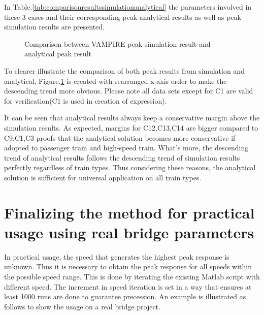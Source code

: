 In Table.\ref{tab:comparisonresultssimulationanalytical} the parameters involved in these 3 cases and their corresponding peak analytical results as well as peak simulation results are presented. 



\begin{figure}[h!]
\centering
{}
\caption{Comparison between VAMPIRE peak simulation result and analytical peak result}
\label{fig:comparisonpeaksimulationanalytical}
\end{figure}

To clearer illustrate the comparison of both peak results from simulation and analytical, Figure.\ref{fig:comparisonpeaksimulationanalytical} is created with rearranged x-axis order to make the descending trend more obvious. Please note all data sets except for C1 are valid for verification(C1 is used in creation of expression).

It can be seen that analytical results always keep a conservative margin above the simulation results. As expected, margins for C12,C13,C14 are bigger compared to C9,C1,C3 proofs that the analytical solution becomes more conservative if adopted to passenger train and high-speed train. What's more, the descending trend of analytical results follows the descending trend of simulation results perfectly regardless of train types. Thus considering these reasons, the analytical solution is sufficient for universal application on all train types.

\chapter{Finalizing the method for practical usage using real bridge parameters}

In practical usage, the speed that generates the highest peak response is unknown. Thus it is necessary to obtain the peak response for all speeds within the possible speed range. This is done by iterating the existing Matlab script with different speed. The increment in speed iteration is set in a way that ensures at least 1000 runs are done to guarantee precession. An example is illustrated as follows to show the usage on a real bridge project.

